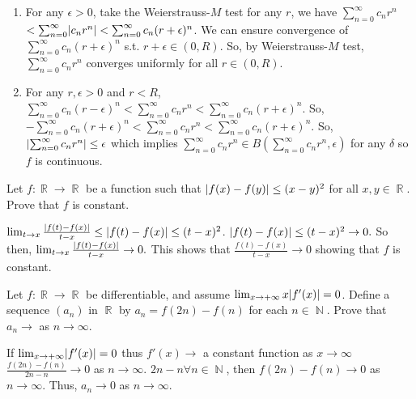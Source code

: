 \documentclass[12pt,letterpaper,boxed]{hmcpset}
\DeclareMathOperator{\N}{\mathbb{N}}
\DeclareMathOperator{\R}{\mathbb{R}}
\DeclarePairedDelimiter\abs{\lvert}{\rvert}%
\begin{document}
\begin{solution}
\begin{enumerate}
    \item For any $\epsilon > 0$, take the Weierstrauss-$M$ test for any $r$, we have $\sum_{n=0}^{\infty}c_nr^{n}$ $ < \sum_{n=0}^{\infty}\abs{c_nr^{n}} < \sum_{n=0}^{\infty}c_n(r + \epsilon)^{n}$. We can ensure convergence of $\sum_{n=0}^{\infty}c_n(r + \epsilon )^{n}$ s.t. $r + \epsilon \in (0,R)$. So, by Weierstrauss-$M$ test, $\sum_{n=0}^{\infty}c_nr^{n}$ converges uniformly for all $r\in(0, R).$
    \item For any $r, \epsilon > 0$ and $r < R$, $\sum_{n=0}^{\infty}c_n(r - \epsilon)^{n} < \sum_{n=0}^{\infty}c_nr^{n} < \sum_{n=0}^{\infty}c_n(r + \epsilon)^{n}$. So, $-\sum_{n=0}^{\infty}c_n(r + \epsilon)^{n} < \sum_{n=0}^{\infty}c_nr^{n} < \sum_{n=0}^{\infty}c_n(r + \epsilon)^{n}$. So, $\abs{\sum_{n=0}^{\infty}c_nr^{n}} \leq \epsilon$ which implies $\sum_{n=0}^{\infty}c_nr^{n} \in B(\sum_{n=0}^{\infty}c_nr^{n}, \epsilon)$ for any $\delta$ so $f$ is continuous.
\end{enumerate}
\end{solution}


\begin{problem}[Exercise 1.5]
Let $f: \R \rightarrow \R$ be a function such that $\abs{f(x) - f(y)} \leq (x - y)^{2}$ for all $x, y \in \R.$ Prove that $f$ is constant.
\end{problem}

\begin{solution}
$\lim_{t\rightarrow x} \frac{\abs{f(t) - f(x)}}{t - x} \leq \abs{f(t) - f(x)} \leq (t - x)^{2}$. $ \abs{f(t) - f(x)} \leq (t - x)^{2} \rightarrow 0.$ So then, $\lim_{t \rightarrow x} \frac{\abs{f(t) - f(x)}}{t - x} \rightarrow 0.$ This shows that $\frac{f(t) - f(x)}{t - x}\rightarrow 0$ showing that $f$ is constant.
\end{solution}
\pagebreak
\begin{problem}[Exercise 1.11]
Let $f: \R \rightarrow \R$ be differentiable, and assume $\lim_{x \rightarrow +\infty}x\abs{f'(x)}=0$. Define a sequence $(a_n)$ in $\R$ by $a_n = f(2n) -f(n)$ for each $n \in \N$. Prove that $a_n \rightarrow$ as $n\rightarrow\infty$.
\end{problem}

\begin{solution}
If $\lim_{x \rightarrow +\infty} \abs{f'(x)}= 0$ thus $f'(x) \rightarrow$ a constant function as $x \rightarrow \infty$ $\frac{f(2n) - f(n)}{2n - n}\rightarrow 0$ as $n \rightarrow \infty$. $2n - n \forall n\in\N$, then $f(2n) - f(n)\rightarrow 0$ as $n\rightarrow \infty$. Thus, $a_n\rightarrow 0$ as $n \rightarrow \infty.$
\end{solution}
\end{document}
